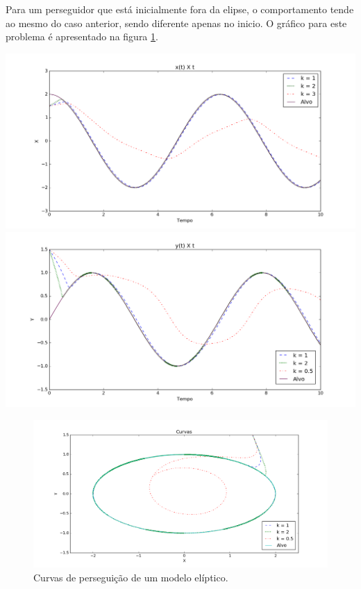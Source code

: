 \documentclass[a4paper,10pt]{article}
\begin{document}
  Para um perseguidor que está inicialmente fora da elipse, o comportamento tende ao mesmo do caso anterior, sendo diferente apenas no inicio. O gráfico para este problema é apresentado na figura \ref{fig:curva-el-1}.
  
   \includegraphics[width=\textwidth]{el-1-X.png}
   \includegraphics[width=\textwidth]{el-1-Y.png}
   \begin{figure}[H]
   \includegraphics[width=\textwidth]{el-1-XY.png}
   \caption{Curvas de perseguição de um modelo elíptico.}
   \label{fig:curva-el-1}
  \end{figure}
  
\end{document}
